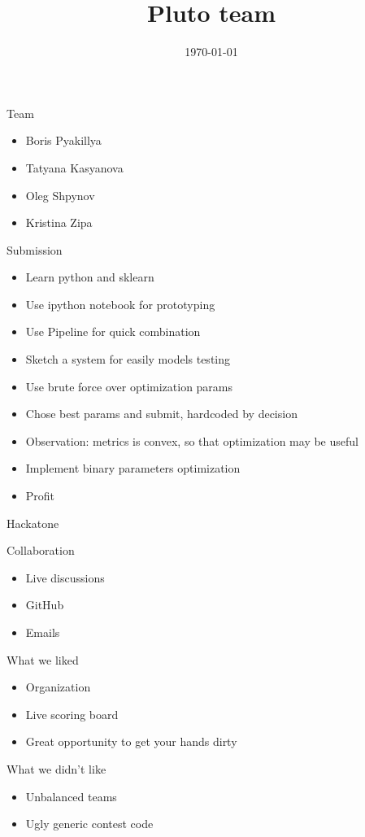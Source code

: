 \documentclass{beamer}
\title{Pluto team}
\institute{\#MSRMLI2015}
\date{\today}
\begin{document}
\begin{frame}
  \titlepage
\end{frame}

\begin{frame}{Team}
\begin{itemize}
\item Boris Pyakillya
\item Tatyana Kasyanova
\item Oleg Shpynov
\item Kristina Zipa
\end{itemize}
\end{frame}

\begin{frame}{Submission}
\begin{itemize}
\item Learn python and sklearn
\item Use ipython notebook for prototyping
\item Use Pipeline for quick combination
\item Sketch a system for easily models testing
\item Use brute force over optimization params
\item Chose best params and submit, hardcoded by decision
\item Observation: metrics is convex, so that optimization may be useful
\item Implement binary parameters optimization
\item Profit
\end{itemize}
\end{frame}

\begin{frame}{Hackatone}
\begin{block}{Collaboration}
\begin{itemize}
	\item Live discussions
	\item GitHub
	\item Emails
\end{itemize}
\end{block}
\begin{block}{What we liked}
\begin{itemize}
	\item Organization
	\item Live scoring board
	\item Great opportunity to get your hands dirty
\end{itemize}
\end{block}
\begin{block}{What we didn't like}
\begin{itemize}
	\item Unbalanced teams
	\item Ugly generic contest code
\end{itemize}
\end{block}
\end{frame}
\end{document}
